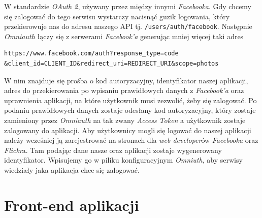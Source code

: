 \documentclass[openright]{xmgr}
\begin{document}
\newpage\indent W standardzie \textit{OAuth 2}, używany przez między innymi \textit{Facebooka}. Gdy chcemy się zalogować do tego serwisu wystarczy nacisnąć guzik logowania, który przekierowuje nas do adresu naszego API tj. \verb|/users/auth/facebook|. Następnie \textit{Omniauth} łączy się z serwerami \textit{Facebook'a} generując mniej więcej taki adres 
\begin{verbatim}
https://www.facebook.com/auth?response_type=code
&client_id=CLIENT_ID&redirect_uri=REDIRECT_URI&scope=photos
\end{verbatim}
 W nim znajduje się prośba o kod autoryzacyjny, identyfikator naszej aplikacji, adres do przekierowania po wpisaniu prawidłowych danych z \textit{Facebook'a} oraz uprawnienia aplikacji, na które użytkownik musi zezwolić, żeby się zalogować. Po podaniu prawidłowych danych zostaje odesłany kod autoryzacyjny, który zostaje zamieniony przez \textit{Omniauth }na tak zwany \textit{Access Token} a użytkownik zostaje zalogowany do aplikacji. Aby użytkownicy mogli się logować do naszej aplikacji należy wcześniej ją zarejestrować na stronach dla \textit{web developer}ów \textit{Facebooka} oraz \textit{Flickr}a. Tam podając dane nasze oraz aplikacji zostaje wygenerowany identyfikator. Wpisujemy go w piliku konfiguracyjnym \textit{Omniuth}, aby serwisy wiedziały jaka aplikacja chce się zalogować.

\section{Front-end aplikacji}
\end{document}
